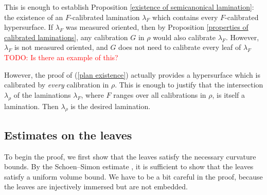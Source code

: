 \documentclass[reqno,11pt]{amsart}
\theoremstyle{definition}
\numberwithin{equation}{section}
\newcommand\todo[1]{\textcolor{red}{TODO: #1}}
\begin{document}
This is enough to establish Proposition \ref{existence of semicanonical lamination}: the existence of an $F$-calibrated lamination $\lambda_F$ which contains every $F$-calibrated hypersurface.
If $\lambda_F$ was measured oriented, then by Proposition \ref{properties of calibrated laminations}, any calibration $G$ in $\rho$ would also calibrate $\lambda_F$.
However, $\lambda_F$ is not measured oriented, and $G$ does not need to calibrate every leaf of $\lambda_F$ \todo{Is there an example of this?}

However, the proof of (\ref{plan existence}) actually provides a hypersurface which is calibrated by \emph{every} calibration in $\rho$.
This is enough to justify that the intersection $\lambda_\rho$ of the laminations $\lambda_F$, where $F$ ranges over all calibrations in $\rho$, is itself a lamination.
Then $\lambda_\rho$ is the desired lamination.

\subsection{Estimates on the leaves}
To begin the proof, we first show that the leaves satisfy the necessary curvature bounds.
By the Schoen--Simon estimate \cite{Schoen81}, it is sufficient to show that the leaves satisfy a uniform volume bound.
We have to be a bit careful in the proof, because the leaves are injectively immersed but are not embedded.
\end{document}
